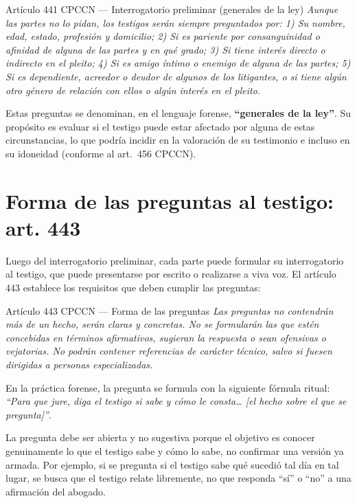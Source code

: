 \documentclass[12pt,oneside]{book}
\begin{document}
\begin{norma}{Artículo 441 CPCCN --- Interrogatorio preliminar (generales de la ley)}
\textit{Aunque las partes no lo pidan, los testigos serán siempre preguntados por: 1) Su nombre, edad, estado, profesión y domicilio; 2) Si es pariente por consanguinidad o afinidad de alguna de las partes y en qué grado; 3) Si tiene interés directo o indirecto en el pleito; 4) Si es amigo íntimo o enemigo de alguna de las partes; 5) Si es dependiente, acreedor o deudor de algunos de los litigantes, o si tiene algún otro género de relación con ellos o algún interés en el pleito.}
\end{norma}

Estas preguntas se denominan, en el lenguaje forense, \textbf{``generales de la ley''}. Su propósito es evaluar si el testigo puede estar afectado por alguna de estas circunstancias, lo que podría incidir en la valoración de su testimonio e incluso en su idoneidad (conforme al art.~456 CPCCN).

\section{Forma de las preguntas al testigo: art. 443}

Luego del interrogatorio preliminar, cada parte puede formular su interrogatorio al testigo, que puede presentarse por escrito o realizarse a viva voz. El artículo 443 establece los requisitos que deben cumplir las preguntas:

\begin{norma}{Artículo 443 CPCCN --- Forma de las preguntas}
\textit{Las preguntas no contendrán más de un hecho, serán claras y concretas. No se formularán las que estén concebidas en términos afirmativos, sugieran la respuesta o sean ofensivas o vejatorias. No podrán contener referencias de carácter técnico, salvo si fuesen dirigidas a personas especializadas.}
\end{norma}

En la práctica forense, la pregunta se formula con la siguiente fórmula ritual: \textit{``Para que jure, diga el testigo si sabe y cómo le consta\ldots{} [el hecho sobre el que se pregunta]''}.

La pregunta debe ser abierta y no sugestiva porque el objetivo es conocer genuinamente lo que el testigo sabe y cómo lo sabe, no confirmar una versión ya armada. Por ejemplo, si se pregunta si el testigo sabe qué sucedió tal día en tal lugar, se busca que el testigo relate libremente, no que responda ``sí'' o ``no'' a una afirmación del abogado.
\end{document}
